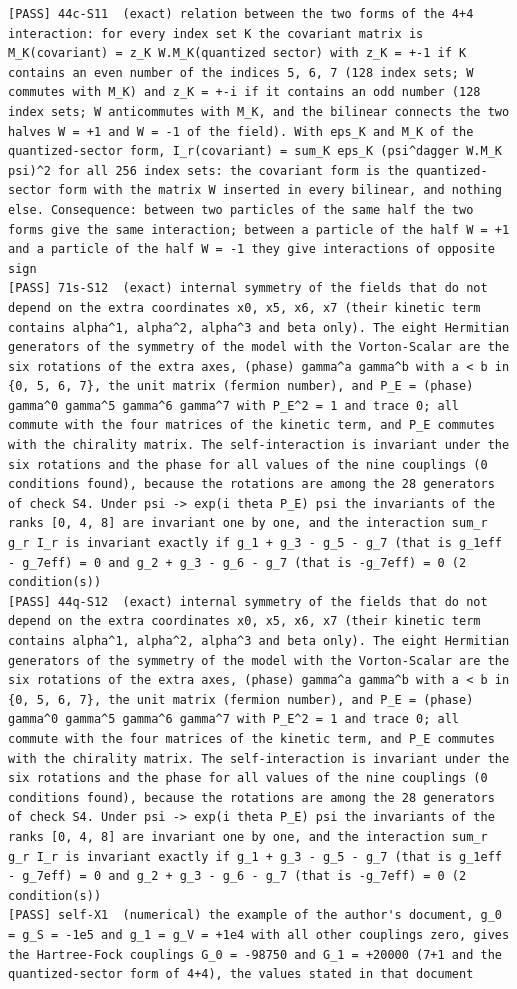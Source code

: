 \documentclass[
  10pt,
]{article}
\begin{document}
\begin{verbatim}
[PASS] 44c-S11  (exact) relation between the two forms of the 4+4 interaction: for every index set K the covariant matrix is M_K(covariant) = z_K W.M_K(quantized sector) with z_K = +-1 if K contains an even number of the indices 5, 6, 7 (128 index sets; W commutes with M_K) and z_K = +-i if it contains an odd number (128 index sets; W anticommutes with M_K, and the bilinear connects the two halves W = +1 and W = -1 of the field). With eps_K and M_K of the quantized-sector form, I_r(covariant) = sum_K eps_K (psi^dagger W.M_K psi)^2 for all 256 index sets: the covariant form is the quantized-sector form with the matrix W inserted in every bilinear, and nothing else. Consequence: between two particles of the same half the two forms give the same interaction; between a particle of the half W = +1 and a particle of the half W = -1 they give interactions of opposite sign
[PASS] 71s-S12  (exact) internal symmetry of the fields that do not depend on the extra coordinates x0, x5, x6, x7 (their kinetic term contains alpha^1, alpha^2, alpha^3 and beta only). The eight Hermitian generators of the symmetry of the model with the Vorton-Scalar are the six rotations of the extra axes, (phase) gamma^a gamma^b with a < b in {0, 5, 6, 7}, the unit matrix (fermion number), and P_E = (phase) gamma^0 gamma^5 gamma^6 gamma^7 with P_E^2 = 1 and trace 0; all commute with the four matrices of the kinetic term, and P_E commutes with the chirality matrix. The self-interaction is invariant under the six rotations and the phase for all values of the nine couplings (0 conditions found), because the rotations are among the 28 generators of check S4. Under psi -> exp(i theta P_E) psi the invariants of the ranks [0, 4, 8] are invariant one by one, and the interaction sum_r g_r I_r is invariant exactly if g_1 + g_3 - g_5 - g_7 (that is g_1eff - g_7eff) = 0 and g_2 + g_3 - g_6 - g_7 (that is -g_7eff) = 0 (2 condition(s))
[PASS] 44q-S12  (exact) internal symmetry of the fields that do not depend on the extra coordinates x0, x5, x6, x7 (their kinetic term contains alpha^1, alpha^2, alpha^3 and beta only). The eight Hermitian generators of the symmetry of the model with the Vorton-Scalar are the six rotations of the extra axes, (phase) gamma^a gamma^b with a < b in {0, 5, 6, 7}, the unit matrix (fermion number), and P_E = (phase) gamma^0 gamma^5 gamma^6 gamma^7 with P_E^2 = 1 and trace 0; all commute with the four matrices of the kinetic term, and P_E commutes with the chirality matrix. The self-interaction is invariant under the six rotations and the phase for all values of the nine couplings (0 conditions found), because the rotations are among the 28 generators of check S4. Under psi -> exp(i theta P_E) psi the invariants of the ranks [0, 4, 8] are invariant one by one, and the interaction sum_r g_r I_r is invariant exactly if g_1 + g_3 - g_5 - g_7 (that is g_1eff - g_7eff) = 0 and g_2 + g_3 - g_6 - g_7 (that is -g_7eff) = 0 (2 condition(s))
[PASS] self-X1  (numerical) the example of the author's document, g_0 = g_S = -1e5 and g_1 = g_V = +1e4 with all other couplings zero, gives the Hartree-Fock couplings G_0 = -98750 and G_1 = +20000 (7+1 and the quantized-sector form of 4+4), the values stated in that document
\end{verbatim}
\end{document}
